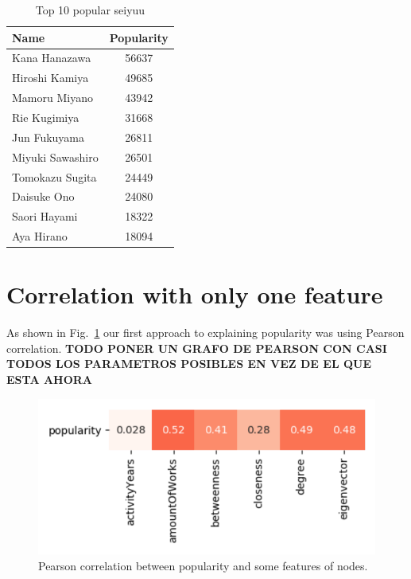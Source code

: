 \begin{table}[!h]
	\begin{center}
	\caption{Top 10 popular seiyuu}
	\label{tab:top10Popularity}
	\begin{tabular}{|l|c|}
		\hline
		Name & Popularity \\ 
		\hline
		Kana Hanazawa & 56637 \\ 
		\hline
		Hiroshi Kamiya & 49685 \\ 
		\hline
		Mamoru Miyano & 43942 \\ 
		\hline
		Rie Kugimiya & 31668 \\ 
		\hline
		Jun Fukuyama & 26811 \\ 
		\hline
		Miyuki Sawashiro & 26501 \\ 
		\hline
		Tomokazu Sugita & 24449 \\ 
		\hline
		Daisuke Ono & 24080 \\ 
		\hline
		Saori Hayami & 18322 \\ 
		\hline
		Aya Hirano & 18094 \\ 
		\hline
	\end{tabular}
	\end{center}
\end{table}

\section{Correlation with only one feature}
As shown in Fig.~\ref{fig:pearsonCorr} our first approach to explaining popularity was using Pearson correlation. 
\textbf{TODO PONER UN GRAFO DE PEARSON CON CASI TODOS LOS PARAMETROS POSIBLES EN VEZ DE EL QUE ESTA AHORA}

\begin{figure}[!h]
	\begin{center}
	\includegraphics[width=\columnwidth]{graphics/10Works_correlation_Pearson.png}
	\caption{Pearson correlation between popularity and some features of nodes.}
	\label{fig:pearsonCorr}
	\end{center}
\end{figure}

